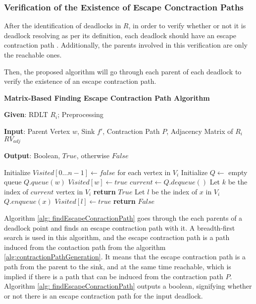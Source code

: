 \subsubsection*{Verification of the Existence of Escape Conctraction Paths}
After the identification of deadlocks in $R$, in order to verify whether or not it is deadlock resolving as per its definition, each deadlock should have an escape contraction path \cite{Ramirez}. Additionally, the parents involved in this verification are only the reachable ones.

Then, the proposed algorithm will go through each parent of each deadlock to verify the existence of an escape contraction path. 


\begin{algorithm}[H]
\caption{\textbf{Matrix-Based Finding Escape Contraction Path Algorithm}}
\label{alg: findEscapeConractionPath}
\textbf{Given}: RDLT $R_i$; Preprocessing


\textbf{Input}: Parent Vertex $w$, Sink $f'$, Contraction Path $P$, Adjacency Matrix of $R_i$ $RV_{adj}$

\textbf{Output}: Boolean, $True$, otherwise $False$  

\begin{algorithmic}[1]
    \State Initialize $Visited[0...n-1] \gets false$ \Comment for each vertex in $V_i$
    \State Initialize $Q \gets$ empty queue
    \State $Q.queue(w)$
    \State $Visited[w] \gets true$
        \State $current \gets Q.dequeue()$
        \State Let $k$ be the index of $current$ vertex in $V_i$
            \State \textbf{return }$True$
                \State  Let $l$ be the index of $x$ in $V_i$
                    \State $Q.enqueue(x)$
                    \State $Visited[l] \gets true$
                \EndIf
            \EndFor
        \EndIf
    \EndWhile
    \State \textbf{return }$False$
    
\end{algorithmic}
\end{algorithm}

Algorithm \ref{alg: findEscapeConractionPath} goes through the each parents of a deadlock point and finds an escape contraction path with it. A breadth-first search is used in this algorithm, and the escape contraction path is a path induced from the contaction path from the algorithm \ref{alg:contractionPathGeneration}. It means that the escape contraction path is a path from the parent to the sink, and at the same time reachable, which is implied if there is a path that can be induced from the contraction path $P$. Algorithm \ref{alg: findEscapeConractionPath} outputs a boolean, signifying whether or not there is an escape contraction path for the input deadlock.

